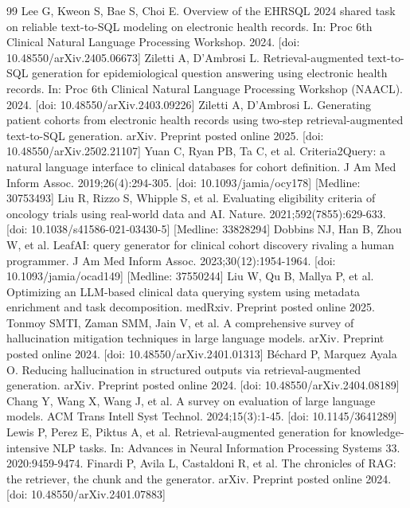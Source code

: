 \documentclass[10pt,twocolumn]{article}
\begin{document}
\begin{thebibliography}{99}
 Lee G, Kweon S, Bae S, Choi E. Overview of the EHRSQL 2024 shared task on reliable text-to-SQL modeling on electronic health records. In: Proc 6th Clinical Natural Language Processing Workshop. 2024. [doi: 10.48550/arXiv.2405.06673]
 Ziletti A, D'Ambrosi L. Retrieval-augmented text-to-SQL generation for epidemiological question answering using electronic health records. In: Proc 6th Clinical Natural Language Processing Workshop (NAACL). 2024. [doi: 10.48550/arXiv.2403.09226]
 Ziletti A, D'Ambrosi L. Generating patient cohorts from electronic health records using two-step retrieval-augmented text-to-SQL generation. arXiv. Preprint posted online 2025. [doi: 10.48550/arXiv.2502.21107]
 Yuan C, Ryan PB, Ta C, et al. Criteria2Query: a natural language interface to clinical databases for cohort definition. J Am Med Inform Assoc. 2019;26(4):294-305. [doi: 10.1093/jamia/ocy178] [Medline: 30753493]
 Liu R, Rizzo S, Whipple S, et al. Evaluating eligibility criteria of oncology trials using real-world data and AI. Nature. 2021;592(7855):629-633. [doi: 10.1038/s41586-021-03430-5] [Medline: 33828294]
 Dobbins NJ, Han B, Zhou W, et al. LeafAI: query generator for clinical cohort discovery rivaling a human programmer. J Am Med Inform Assoc. 2023;30(12):1954-1964. [doi: 10.1093/jamia/ocad149] [Medline: 37550244]
 Liu W, Qu B, Mallya P, et al. Optimizing an LLM-based clinical data querying system using metadata enrichment and task decomposition. medRxiv. Preprint posted online 2025.
 Tonmoy SMTI, Zaman SMM, Jain V, et al. A comprehensive survey of hallucination mitigation techniques in large language models. arXiv. Preprint posted online 2024. [doi: 10.48550/arXiv.2401.01313]
 B\'echard P, Marquez Ayala O. Reducing hallucination in structured outputs via retrieval-augmented generation. arXiv. Preprint posted online 2024. [doi: 10.48550/arXiv.2404.08189]
 Chang Y, Wang X, Wang J, et al. A survey on evaluation of large language models. ACM Trans Intell Syst Technol. 2024;15(3):1-45. [doi: 10.1145/3641289]
 Lewis P, Perez E, Piktus A, et al. Retrieval-augmented generation for knowledge-intensive NLP tasks. In: Advances in Neural Information Processing Systems 33. 2020:9459-9474.
 Finardi P, Avila L, Castaldoni R, et al. The chronicles of RAG: the retriever, the chunk and the generator. arXiv. Preprint posted online 2024. [doi: 10.48550/arXiv.2401.07883]

\end{thebibliography}
\end{document}
